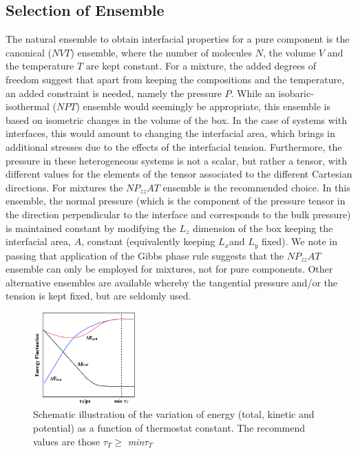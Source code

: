 \documentclass[9pt,tutorial]{livecoms}
\begin{document}
\subsection{Selection of Ensemble}
\label{sec:ensemble}
The natural ensemble to obtain interfacial properties for a pure component is
the canonical ($NVT$) ensemble, where the number of molecules
$N$, the volume $V$ and the temperature $T$ are kept
constant\textit{.} For a mixture, the added degrees of freedom suggest that
apart from keeping the compositions and the temperature, an added constraint is
needed, namely the pressure $P$. While an isobaric-isothermal
($NPT$) ensemble would seemingly be appropriate, this ensemble is based
on isometric changes in the volume of the box. In the case of systems with
interfaces, this would amount to changing the interfacial area, which brings in
additional stresses due to the effects of the interfacial tension. Furthermore,
the pressure in these heterogeneous systems is not a scalar, but rather
a tensor, with different values for the elements of the tensor associated to
the different Cartesian directions.  For mixtures the
$NP_{zz}AT$ ensemble is the recommended choice. In this
ensemble, the normal pressure (which is the component of the pressure tensor in
the direction perpendicular to the interface and corresponds to the bulk
pressure) is maintained constant by modifying the $L_{z}$ dimension of
the box keeping the interfacial area, $A$, constant (equivalently
keeping $L_{x }$and $L_{y}$ fixed). We note in passing that
application of the Gibbs phase rule suggests that the
$NP_{zz}AT$ ensemble can only be employed for mixtures, not
for pure components. Other alternative ensembles are available
\citep{zhang1995} whereby the tangential pressure and/or the tension
is kept fixed, but are seldomly used.  


\begin{figure}
  \centering
\includegraphics[width=0.35\textwidth]{gfx/image25.png}
\caption{Schematic illustration of the variation of energy (total, kinetic and potential) as a function of thermostat constant. The recommend values are those ${\tau}_{ T}{\geq}$ \textit{min${\tau}$}$_{T}$}
\label{fig:5b}
\end{figure}
\end{document}
